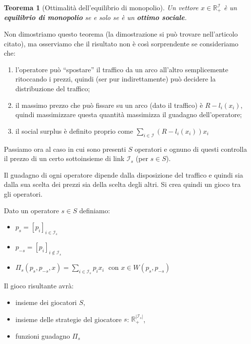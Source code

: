 \documentclass[a4paper]{article}
\theoremstyle{plain}
\newtheorem{myteo}{Teorema}[section]
\theoremstyle{definition}
\theoremstyle{remark}
\newcommand{\pa}[1]{\left(#1\right)}
\newcommand{\bra}[1]{\left[#1\right]}
\newcommand{\abs}[1]{\left|#1\right|}
\begin{document}
\begin{myteo}[Ottimalità dell'equilibrio di
  monopolio{\cite[Proposizione 3.2]{acemoglu2007-2}}]
  Un vettore $x\in \mathbb{R}_+^\mathcal{I}$ è un \textbf{equilibrio
    di monopolio} se e solo se è un \textbf{ottimo sociale}.
\end{myteo}

Non dimostriamo questo teorema (la dimostrazione si può trovare
nell'articolo citato), ma osserviamo che il risultato non è così
sorprendente se consideriamo che:
\begin{enumerate}
\item l'operatore può ``spostare'' il traffico da un arco all'altro
  semplicemente ritoccando i prezzi, quindi (ser pur indirettamente)
  può decidere la distribuzione del traffico;
\item il massimo prezzo che può fissare su un arco (dato il traffico)
  è $R - l_i(x_i)$, quindi massimizzare questa quantità massimizza il
  guadagno dell'operatore;
\item il social surplus è definito proprio come
  $\sum _{i\in\mathcal{I}}\pa{ R - l_i\pa{x_i}}x_i$
\end{enumerate}


Passiamo ora al caso in cui sono presenti $S$ operatori e ognuno di
questi controlla il prezzo di un certo sottoinsieme di link
$\mathcal{I}_s$ (per $s\in S$).

Il guadagno di ogni operatore dipende dalla disposizione del traffico
e quindi sia dalla sua scelta dei prezzi sia della scelta degli
altri. Si crea quindi un gioco tra gli operatori.

Dato un operatore $s\in S$ definiamo:
\begin{itemize}
\item $p_s = \bra{p_i}_{i\in \mathcal{I}_s}$
\item $p_{-s} = \bra{p_i}_{i\not\in \mathcal{I}_s}$
\item $\displaystyle \Pi _s \pa{p_s, p_{-s},x} = \sum _{i\in
    \mathcal{I}_s} p_i x_i\;$ con $x\in W\pa{p_s, p_{-s}}$
\end{itemize}

Il gioco risultante avrà:
\begin{itemize}
\item insieme dei giocatori $S$,
\item insieme delle strategie del giocatore $s$: $\mathbb{R}_+
  ^{\abs{\mathcal{I}_s}}$,
\item funzioni guadagno $\Pi _s$
\end{itemize}
\end{document}
